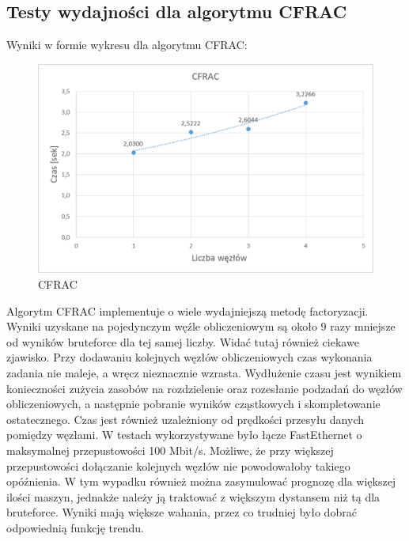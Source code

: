 \documentclass{article}
\begin{document}
\subsection{Testy wydajności dla algorytmu CFRAC}
Wyniki w formie wykresu dla algorytmu CFRAC:
\begin{figure}[h!]
    \includegraphics[width=\linewidth]{CFRAC.png}
    \caption{CFRAC}
    \label{fig:userpagescr}
\end{figure}

Algorytm CFRAC implementuje o wiele wydajniejszą metodę factoryzacji. Wyniki uzyskane na pojedynczym węźle obliczeniowym są około 9 razy mniejsze od wyników bruteforce dla tej samej liczby. Widać tutaj również ciekawe zjawisko. Przy dodawaniu kolejnych węzłów obliczeniowych czas wykonania zadania nie maleje, a wręcz nieznacznie wzrasta. Wydłużenie czasu jest wynikiem konieczności zużycia zasobów na rozdzielenie oraz rozesłanie podzadań do węzłów obliczeniowych, a następnie pobranie wyników cząstkowych i skompletowanie ostatecznego. Czas jest również uzależniony od prędkości przesyłu danych pomiędzy węzłami. W testach wykorzystywane było łącze FastEthernet o maksymalnej przepustowości 100 Mbit/s. Możliwe, że przy większej przepustowości dołączanie kolejnych węzłów nie powodowałoby takiego opóźnienia. W tym wypadku również można zasymulować prognozę dla większej ilości maszyn, jednakże należy ją traktować z większym dystansem niż tą dla bruteforce. Wyniki mają większe wahania, przez co trudniej było dobrać odpowiednią funkcję trendu.
\end{document}
